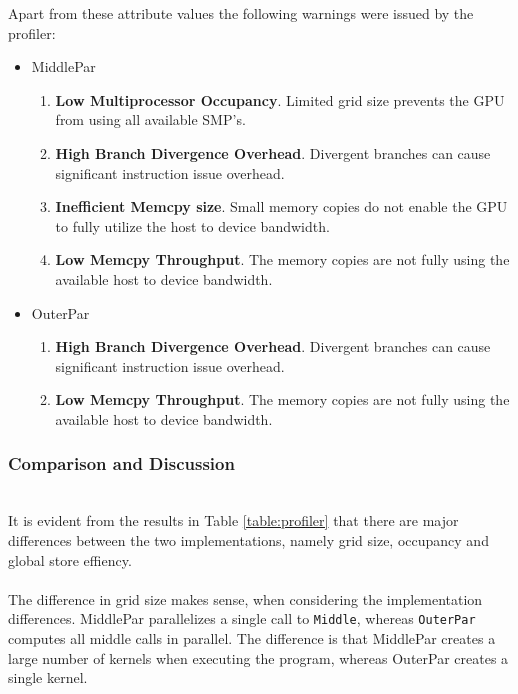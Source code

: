 Apart from these attribute values the following warnings were issued by the profiler:
\begin{itemize}
	\item MiddlePar
	\begin{enumerate}
		\item \textbf{Low Multiprocessor Occupancy}. Limited grid size prevents the GPU from using all available SMP's.
		\item \textbf{High Branch Divergence Overhead}. Divergent branches can cause significant instruction issue overhead.
		\item \textbf{Inefficient Memcpy size}. Small memory copies do not enable the GPU to fully utilize the host to device bandwidth.
		\item \textbf{Low Memcpy Throughput}. The memory copies are not fully using the available host to device bandwidth.
	\end{enumerate}
	\item OuterPar
	\begin{enumerate}
		\item \textbf{High Branch Divergence Overhead}. Divergent branches can cause significant instruction issue overhead.
		\item \textbf{Low Memcpy Throughput}. The memory copies are not fully using the available host to device bandwidth.
	\end{enumerate}
\end{itemize}

\subsubsection{Comparison and Discussion} \hfill \\
It is evident from the results in Table \ref{table:profiler} that there are major differences between the two implementations, namely grid size, occupancy and global store effiency.
\\ \\
The difference in grid size makes sense, when considering the implementation differences. MiddlePar parallelizes a single call to \texttt{Middle}, whereas \texttt{OuterPar} computes all middle calls in parallel. 
The difference is that MiddlePar creates a large number of kernels when executing the program, whereas OuterPar creates a single kernel.\\


